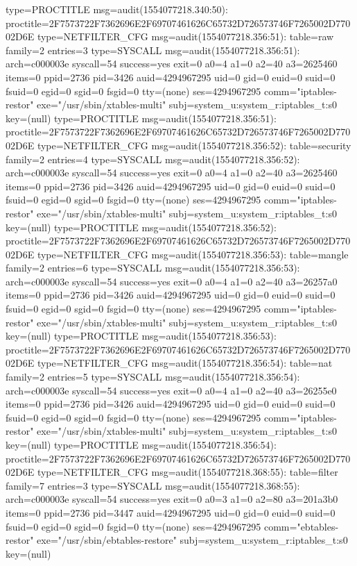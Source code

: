 \documentclass[]{report}
\newenvironment{Shaded}{}{}
\newcommand{\NormalTok}[1]{#1}
\begin{document}
\begin{Shaded}
\begin{Highlighting}[]
\NormalTok{type=PROCTITLE msg=audit(1554077218.340:50): proctitle=2F7573722F7362696E2F69707461626C65732D726573746F7265002D77002D6E}
\NormalTok{type=NETFILTER_CFG msg=audit(1554077218.356:51): table=raw family=2 entries=3}
\NormalTok{type=SYSCALL msg=audit(1554077218.356:51): arch=c000003e syscall=54 success=yes exit=0 a0=4 a1=0 a2=40 a3=2625460 items=0 ppid=2736 pid=3426 auid=4294967295 uid=0 gid=0 euid=0 suid=0 fsuid=0 egid=0 sgid=0 fsgid=0 tty=(none) ses=4294967295 comm="iptables-restor" exe="/usr/sbin/xtables-multi" subj=system_u:system_r:iptables_t:s0 key=(null)}
\NormalTok{type=PROCTITLE msg=audit(1554077218.356:51): proctitle=2F7573722F7362696E2F69707461626C65732D726573746F7265002D77002D6E}
\NormalTok{type=NETFILTER_CFG msg=audit(1554077218.356:52): table=security family=2 entries=4}
\NormalTok{type=SYSCALL msg=audit(1554077218.356:52): arch=c000003e syscall=54 success=yes exit=0 a0=4 a1=0 a2=40 a3=2625460 items=0 ppid=2736 pid=3426 auid=4294967295 uid=0 gid=0 euid=0 suid=0 fsuid=0 egid=0 sgid=0 fsgid=0 tty=(none) ses=4294967295 comm="iptables-restor" exe="/usr/sbin/xtables-multi" subj=system_u:system_r:iptables_t:s0 key=(null)}
\NormalTok{type=PROCTITLE msg=audit(1554077218.356:52): proctitle=2F7573722F7362696E2F69707461626C65732D726573746F7265002D77002D6E}
\NormalTok{type=NETFILTER_CFG msg=audit(1554077218.356:53): table=mangle family=2 entries=6}
\NormalTok{type=SYSCALL msg=audit(1554077218.356:53): arch=c000003e syscall=54 success=yes exit=0 a0=4 a1=0 a2=40 a3=26257a0 items=0 ppid=2736 pid=3426 auid=4294967295 uid=0 gid=0 euid=0 suid=0 fsuid=0 egid=0 sgid=0 fsgid=0 tty=(none) ses=4294967295 comm="iptables-restor" exe="/usr/sbin/xtables-multi" subj=system_u:system_r:iptables_t:s0 key=(null)}
\NormalTok{type=PROCTITLE msg=audit(1554077218.356:53): proctitle=2F7573722F7362696E2F69707461626C65732D726573746F7265002D77002D6E}
\NormalTok{type=NETFILTER_CFG msg=audit(1554077218.356:54): table=nat family=2 entries=5}
\NormalTok{type=SYSCALL msg=audit(1554077218.356:54): arch=c000003e syscall=54 success=yes exit=0 a0=4 a1=0 a2=40 a3=26255e0 items=0 ppid=2736 pid=3426 auid=4294967295 uid=0 gid=0 euid=0 suid=0 fsuid=0 egid=0 sgid=0 fsgid=0 tty=(none) ses=4294967295 comm="iptables-restor" exe="/usr/sbin/xtables-multi" subj=system_u:system_r:iptables_t:s0 key=(null)}
\NormalTok{type=PROCTITLE msg=audit(1554077218.356:54): proctitle=2F7573722F7362696E2F69707461626C65732D726573746F7265002D77002D6E}
\NormalTok{type=NETFILTER_CFG msg=audit(1554077218.368:55): table=filter family=7 entries=3}
\NormalTok{type=SYSCALL msg=audit(1554077218.368:55): arch=c000003e syscall=54 success=yes exit=0 a0=3 a1=0 a2=80 a3=201a3b0 items=0 ppid=2736 pid=3447 auid=4294967295 uid=0 gid=0 euid=0 suid=0 fsuid=0 egid=0 sgid=0 fsgid=0 tty=(none) ses=4294967295 comm="ebtables-restor" exe="/usr/sbin/ebtables-restore" subj=system_u:system_r:iptables_t:s0 key=(null)}

\end{Highlighting}
\end{Shaded}
\end{document}
